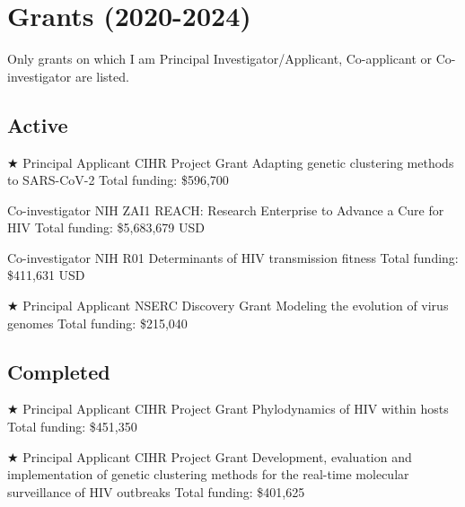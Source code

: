 
\section{Grants (2020-2024)}

Only grants on which I am Principal Investigator/Applicant, Co-applicant or Co-investigator are listed.



\subsection {Active}


{$\bigstar$ Principal Applicant}
{CIHR Project Grant}
{Adapting genetic clustering methods to SARS-CoV-2}
{Total funding: \$596,700} %
{
}


{Co-investigator}
{NIH ZAI1}  %
{REACH: Research Enterprise to Advance a Cure for HIV}
{Total funding: \$5,683,679 USD}
{
}


{Co-investigator}
{NIH R01}  %
{Determinants of HIV transmission fitness}
{Total funding: \$411,631 USD}
{}



{$\bigstar$ Principal Applicant}
{NSERC Discovery Grant}
{Modeling the evolution of virus genomes}
{Total funding: \$215,040} %
{
}







\vspace{1em}

\subsection {Completed}



{$\bigstar$ Principal Applicant}
{CIHR Project Grant} %
{Phylodynamics of HIV within hosts}
{Total funding: \$451,350}
{
}


{$\bigstar$ Principal Applicant}
{CIHR Project Grant} %
{Development, evaluation and implementation of genetic clustering methods for the real-time molecular surveillance of HIV outbreaks}
{Total funding: \$401,625}
{
}



